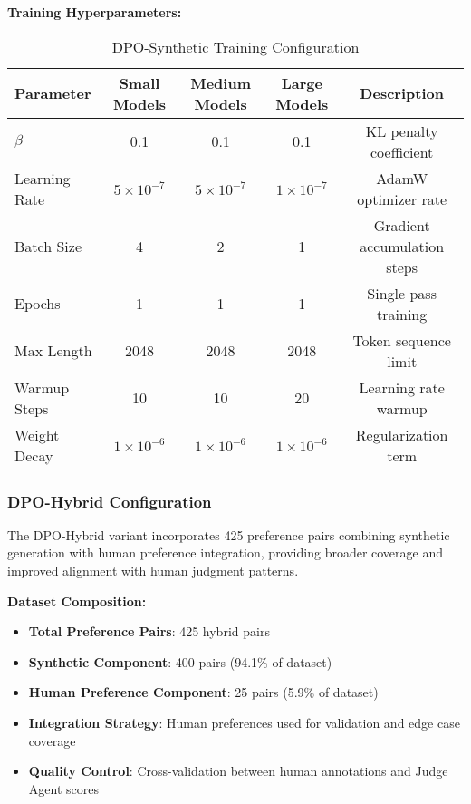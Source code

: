 \textbf{Training Hyperparameters:}
\begin{table}[H]
\centering
\caption{DPO-Synthetic Training Configuration}
\label{tab:dpo-synthetic-config}
\begin{tabular}{lcccc}
\toprule
\textbf{Parameter} & \textbf{Small Models} & \textbf{Medium Models} & \textbf{Large Models} & \textbf{Description} \\
\midrule
$\beta$ & 0.1 & 0.1 & 0.1 & KL penalty coefficient \\
Learning Rate & $5 \times 10^{-7}$ & $5 \times 10^{-7}$ & $1 \times 10^{-7}$ & AdamW optimizer rate \\
Batch Size & 4 & 2 & 1 & Gradient accumulation steps \\
Epochs & 1 & 1 & 1 & Single pass training \\
Max Length & 2048 & 2048 & 2048 & Token sequence limit \\
Warmup Steps & 10 & 10 & 20 & Learning rate warmup \\
Weight Decay & $1 \times 10^{-6}$ & $1 \times 10^{-6}$ & $1 \times 10^{-6}$ & Regularization term \\
\bottomrule
\end{tabular}
\end{table}

\subsubsection{DPO-Hybrid Configuration}

The DPO-Hybrid variant incorporates 425 preference pairs combining synthetic generation with human preference integration, providing broader coverage and improved alignment with human judgment patterns.

\textbf{Dataset Composition:}
\begin{itemize}
    \item \textbf{Total Preference Pairs}: 425 hybrid pairs
    \item \textbf{Synthetic Component}: 400 pairs (94.1\% of dataset)
    \item \textbf{Human Preference Component}: 25 pairs (5.9\% of dataset)
    \item \textbf{Integration Strategy}: Human preferences used for validation and edge case coverage
    \item \textbf{Quality Control}: Cross-validation between human annotations and Judge Agent scores
\end{itemize}

